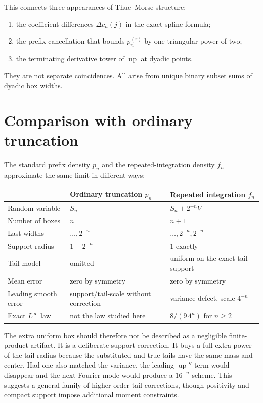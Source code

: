 \documentclass[11pt,oneside]{article}
\theoremstyle{definition}
\theoremstyle{remark}
\newcommand{\Up}{\operatorname{up}}
\begin{document}
This connects three appearances of Thue--Morse structure:
\begin{enumerate}
\item the coefficient differences $\Delta c_n(j)$ in the exact spline formula;
\item the prefix cancellation that bounds $p_n^{(r)}$ by one triangular power of two;
\item the terminating derivative tower of $\Up$ at dyadic points.
\end{enumerate}
They are not separate coincidences.  All arise from unique binary subset sums of dyadic box
widths.

\section{Comparison with ordinary truncation}
\label{sec:comparison}

The standard prefix density $p_n$ and the repeated-integration density $f_n$ approximate the
same limit in different ways:
\begin{center}
\begin{tabularx}{0.96\textwidth}{@{}p{}XX@{}}
\toprule
 & Ordinary truncation $p_n$ & Repeated integration $f_n$\\
\midrule
Random variable & $S_n$ & $S_n+2^{-n}V$\\
Number of boxes & $n$ & $n+1$\\
Last widths & $\ldots,2^{-n}$ & $\ldots,2^{-n},2^{-n}$\\
Support radius & $1-2^{-n}$ & $1$ exactly\\
Tail model & omitted & uniform on the exact tail support\\
Mean error & zero by symmetry & zero by symmetry\\
Leading smooth error & support/tail-scale without correction & variance defect, scale $4^{-n}$\\
Exact $L^\infty$ law & not the law studied here & $8/(9\,4^n)$ for $n\ge2$\\
\bottomrule
\end{tabularx}
\end{center}

The extra uniform box should therefore not be described as a negligible finite-product
artifact.  It is a deliberate support correction.  It buys a full extra power of the tail
radius because the substituted and true tails have the same mass and center.  Had one also
matched the variance, the leading $\Up''$ term would disappear and the next Fourier mode would
produce a $16^{-n}$ scheme.  This suggests a general family of higher-order tail corrections,
though positivity and compact support impose additional moment constraints.
\end{document}
